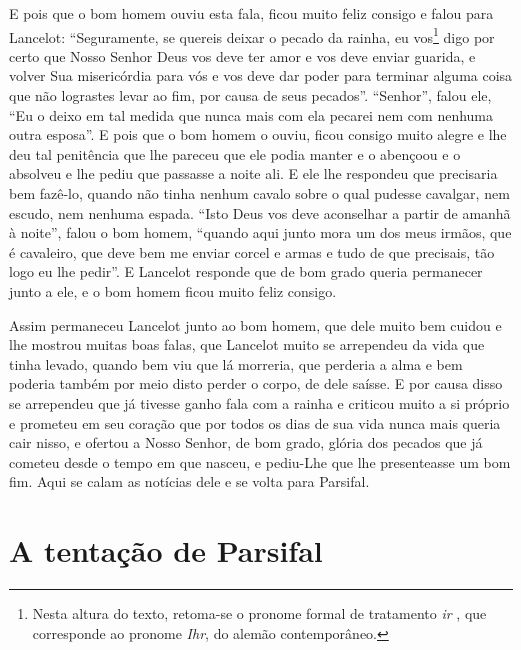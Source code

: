 E pois que o bom homem ouviu esta fala, ficou muito feliz consigo e falou para
Lancelot: “Seguramente, se quereis deixar o pecado da rainha, eu vos\footnote{
Nesta altura do texto, retoma-se o pronome formal de tratamento \textit{ir}
, que corresponde ao pronome \textit{Ihr}, do alemão contemporâneo.
 } digo por certo que Nosso Senhor Deus vos deve ter amor e vos deve enviar
guarida, e volver Sua misericórdia para vós e vos deve dar poder para terminar
alguma coisa que não lograstes levar ao fim, por causa de seus pecados”. 
“Senhor”, falou ele, “Eu o deixo em tal medida que nunca mais com ela
pecarei nem com nenhuma outra esposa”. E pois que o bom homem o ouviu, ficou
consigo muito alegre e lhe deu tal penitência que lhe pareceu que ele podia
manter e o abençoou e o absolveu e lhe pediu que passasse a noite ali. E ele
lhe respondeu que precisaria bem fazê-lo, quando não tinha nenhum cavalo sobre
o qual pudesse cavalgar, nem escudo, nem nenhuma espada. “Isto Deus vos deve
aconselhar a partir de amanhã à noite”, falou o bom homem, “quando aqui junto
mora um dos meus irmãos, que é cavaleiro, que deve bem me enviar corcel e armas
e tudo de que precisais, tão logo eu lhe pedir”. E Lancelot responde
que de bom grado queria permanecer junto a ele, e o bom homem ficou muito feliz
consigo.

Assim permaneceu Lancelot junto ao bom homem, que dele muito bem cuidou e lhe
mostrou muitas boas falas, que Lancelot muito se arrependeu da vida que tinha
levado, quando bem viu que lá morreria, que perderia a alma e bem poderia
também por meio disto perder o corpo, de dele saísse. E por causa disso se
arrependeu que já tivesse ganho fala com a rainha e criticou muito a si próprio
e prometeu em seu coração que por todos os dias de sua vida nunca mais queria
cair nisso, e ofertou a Nosso Senhor, de bom grado, glória dos pecados que já
cometeu desde o tempo em que nasceu, e pediu-Lhe que lhe presenteasse um bom
fim. Aqui se calam as notícias dele e se volta para Parsifal. 

\chapter{A tentação de Parsifal}

